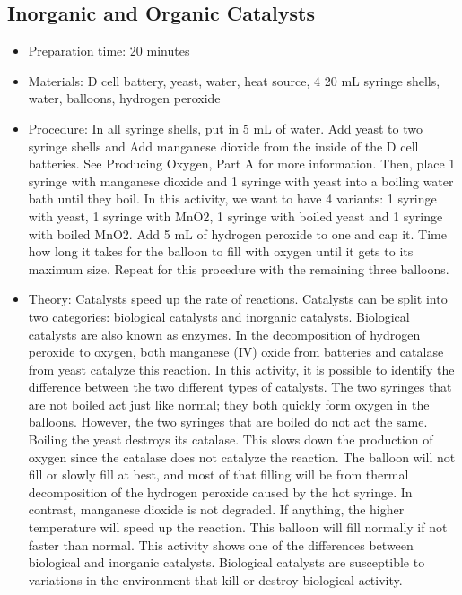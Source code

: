 \subsection{Inorganic and Organic Catalysts}
\begin{itemize}
\item{Preparation time: 20 minutes}
\item{Materials: D cell battery, yeast, water, heat source, 4 20 mL syringe shells, water, balloons, hydrogen peroxide}
\item{Procedure: In all syringe shells, put in 5 mL of water. Add yeast to two syringe shells and Add manganese dioxide from the inside of the D cell batteries. See Producing Oxygen, Part A for more information. Then, place 1 syringe with manganese dioxide and 1 syringe with yeast into a boiling water bath until they boil. In this activity, we want to have 4 variants: 1 syringe with yeast, 1 syringe with MnO2, 1 syringe with boiled yeast and 1 syringe with boiled MnO2. Add 5 mL of hydrogen peroxide to one and cap it. Time how long it takes for the balloon to fill with oxygen until it gets to its maximum size. Repeat for this procedure with the remaining three balloons. }
\item{Theory: Catalysts speed up the rate of reactions. Catalysts can be split into two categories: biological catalysts and inorganic catalysts. Biological catalysts are also known as enzymes. In the decomposition of hydrogen peroxide to oxygen, both manganese (IV) oxide from batteries and catalase from yeast catalyze this reaction. In this activity, it is possible to identify the difference between the two different types of catalysts. The two syringes that are not boiled act just like normal; they both quickly form oxygen in the balloons. However, the two syringes that are boiled do not act the same. Boiling the yeast destroys its catalase. This slows down the production of oxygen since the catalase does not catalyze the reaction. The balloon will not fill or slowly fill at best, and most of that filling will be from thermal decomposition of the hydrogen peroxide caused by the hot syringe. In contrast, manganese dioxide is not degraded. If anything, the higher temperature will speed up the reaction. This balloon will fill normally if not faster than normal. This activity shows one of the differences between biological and inorganic catalysts. Biological catalysts are susceptible to variations in the environment that kill or destroy biological activity.}
\end{itemize}

